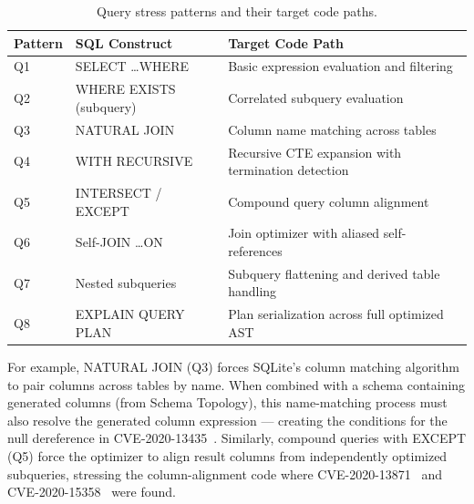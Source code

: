 \begin{table}[H]
\caption{Query stress patterns and their target code paths.}
\label{tab:stress-query-patterns}
\centering
\small
\begin{tabular}{llp{6.5cm}}
\toprule
\textbf{Pattern} & \textbf{SQL Construct} & \textbf{Target Code Path} \\
\midrule
Q1 & SELECT \ldots WHERE & Basic expression evaluation and filtering \\
Q2 & WHERE EXISTS (subquery) & Correlated subquery evaluation \\
Q3 & NATURAL JOIN & Column name matching across tables~\citep{cve202013435} \\
Q4 & WITH RECURSIVE & Recursive CTE expansion with termination detection \\
Q5 & INTERSECT / EXCEPT & Compound query column alignment~\citep{cve202015358, cve202013871} \\
Q6 & Self-JOIN \ldots ON & Join optimizer with aliased self-references \\
Q7 & Nested subqueries & Subquery flattening and derived table handling \\
Q8 & EXPLAIN QUERY PLAN & Plan serialization across full optimized AST \\
\bottomrule
\end{tabular}
\end{table}

For example, NATURAL JOIN (Q3) forces SQLite's column matching algorithm to pair columns across tables by name. When combined with a schema containing generated columns (from Schema Topology), this name-matching process must also resolve the generated column expression --- creating the conditions for the null dereference in CVE-2020-13435~\citep{cve202013435}. Similarly, compound queries with EXCEPT (Q5) force the optimizer to align result columns from independently optimized subqueries, stressing the column-alignment code where CVE-2020-13871~\citep{cve202013871} and CVE-2020-15358~\citep{cve202015358} were found.

